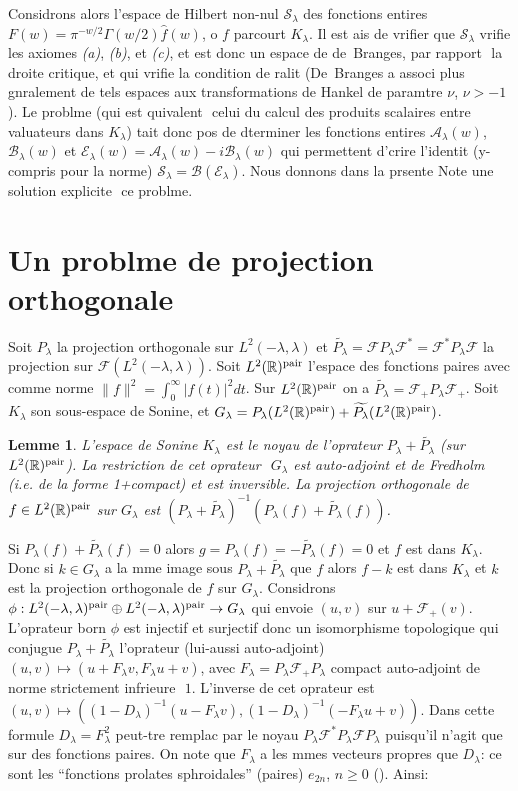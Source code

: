 \documentclass[11pt]{amsart}
\newtheorem{lemme}[theoreme]{Lemme}
\theoremstyle{definition}
\newcommand\RR{{\mathbb R}}
\newcommand\cA{{\mathcal A}}
\newcommand\cB{{\mathcal B}}
\newcommand\cE{{\mathcal E}}
\newcommand\cF{{\mathcal F}}
\newcommand\cS{{\mathcal S}}
\let\wh=\widehat
\let\wt=\widetilde
\let\la=\lambda
\begin{document}
Considrons alors l'espace de Hilbert non-nul $\cS_\la$ des fonctions
entires $F(w) = \pi^{-w/2}\Gamma(w/2)\wh{f}(w)$, o $f$ parcourt
$K_\la$. Il est ais de vrifier que $\cS_\la$ vrifie les axiomes
\textit{(a)}, \textit{(b)}, et \textit{(c)}, et est donc un espace de
de~Branges, par rapport  la droite critique, et qui vrifie la
condition de ralit (De~Branges \cite{bra64, bra} a associ plus
gnralement de tels espaces aux transformations de Hankel de
paramtre $\nu$, $\nu>-1$). Le problme (qui est quivalent  celui du
calcul des produits scalaires entre valuateurs dans $K_\la$) tait donc pos de dterminer
les fonctions entires $\cA_\la(w)$, $\cB_\la(w)$ et $\cE_\la(w) =
\cA_\la(w) - i \cB_\la(w)$ qui permettent d'crire l'identit
(y-compris pour la norme)  $\cS_\la = \cB(\cE_\la)$. Nous donnons dans
la prsente Note une solution explicite  ce problme.

\section{Un problme de projection orthogonale}

Soit
$P_\la$ la projection orthogonale sur $L^2(-\la,\la)$ et $\wt{P_\la}=
\cF P_\la \cF^* = \cF^* P_\la \cF$ la projection sur
$\cF(L^2(-\la,\la))$. Soit $L^2(\RR)^{\rm pair}$ l'espace des fonctions paires 
avec comme norme $\|f\|^2=\int_0^\infty |f(t)|^2dt$. 
Sur $L^2(\RR)^{\rm pair}$ on a  $\wt{P_\la} =
\cF_+ P_\la \cF_+$. Soit 
$K_\la$ son sous-espace de Sonine, et $G_\la =
P_\la(L^2(\RR)^{\rm pair}) + \wt{P_\la}(L^2(\RR)^{\rm pair})$. 

\begin{lemme}
L'espace de Sonine $K_\la$ est le noyau de l'oprateur $P_\la + \wt{P_\la}$ (sur 
$L^2(\RR)^{\rm pair}$). La 
restriction de cet oprateur  $G_\la$ est 
auto-adjoint et de Fredholm (i.e. de la forme 1+compact) et est inversible. La
projection orthogonale de $f\in L^2(\RR)^{\rm pair}$ sur $G_\la$ est
$(P_\la + \wt{P_\la})^{-1} (P_\la(f) + \wt{P_\la}(f))$.
\end{lemme}

Si $P_\la(f) + \wt{P_\la}(f) = 0$ alors $g=P_\la(f)=-\wt{P_\la}(f) = 0$
 et $f$ est dans $K_\la$.
Donc si $k\in G_\la$ a la mme image sous $P_\la + \wt{P_\la}$ que $f$
alors $f-k$ est dans $K_\la$ et $k$ est la projection orthogonale de $f$ sur $G_\la$.
Considrons $\phi: L^2(-\la,\la)^{\rm pair}\oplus
L^2(-\la,\la)^{\rm pair} \to G_\la$ qui envoie $(u,v)$ sur $u +
\cF_+(v)$. L'oprateur born $\phi$ est injectif et surjectif donc un
isomorphisme topologique qui conjugue $P_\la + \wt{P_\la}$ 
l'oprateur (lui-aussi auto-adjoint) $(u,v) \mapsto (u + F_\la v,
F_\la u + v)$, avec $F_\la = P_\la \cF_+ P_\la$ compact auto-adjoint
de norme strictement infrieure  $1$. L'inverse de cet oprateur est
$(u,v) \mapsto ((1 - D_\la)^{-1} (u - F_\la v), (1 - D_\la)^{-1} (-
F_\la u + v))$. Dans cette formule  $D_\la = F_\la^2$  peut-tre
remplac par le noyau $P_\la \cF^* P_\la \cF P_\la$ puisqu'il n'agit que sur
des fonctions paires. On note que $F_\la$ a les mmes vecteurs propres
que $D_\la$: ce sont les ``fonctions prolates sphroidales'' (paires)
$e_{2n}$, $n\geq0$ (\cite{slepian}). Ainsi:
\end{document}
